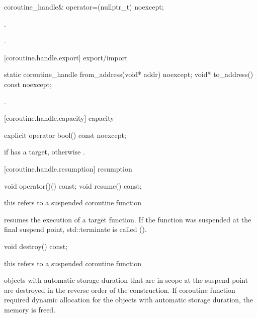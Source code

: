 \begin{itemdecl}
  coroutine_handle& operator=(nullptr_t) noexcept;
\end{itemdecl}
\begin{itemdescr}
	\pnum\postconditions {}.
  
  \pnum\returns {}.
\end{itemdescr}

[coroutine.handle.export]{ export/import}
\begin{itemdecl}
  static coroutine_handle from_address(void* addr) noexcept;		
  void* to_address() const noexcept;
\end{itemdecl}

\begin{itemdescr}
  \pnum
  \postconditions {}.
\end{itemdescr}

[coroutine.handle.capacity]{ capacity}
\begin{itemdecl}
  explicit operator bool() const noexcept;
\end{itemdecl}

\begin{itemdescr}
  \pnum
  \returns {} if  has a target, otherwise .
\end{itemdescr}

[coroutine.handle.resumption]{ resumption}
\begin{itemdecl}
  void operator()() const;
  void resume() const;	
\end{itemdecl}
\begin{itemdescr}
  \pnum
  \precondition *this refers to a suspended coroutine function
  
  \pnum
  \effects resumes the execution of a target function. If the function was suspended
  at the final suspend point, std::terminate is called ().
\end{itemdescr}

\begin{itemdecl}
  void destroy() const;
\end{itemdecl}
\begin{itemdescr}
  \pnum
  \precondition *this refers to a suspended coroutine function
  
  \pnum
  \effects objects with automatic storage duration that are in scope
  at the suspend point are destroyed in the reverse order of the construction. If coroutine function required dynamic allocation
  for the objects with automatic storage duration, the memory
  is freed.
\end{itemdescr}

